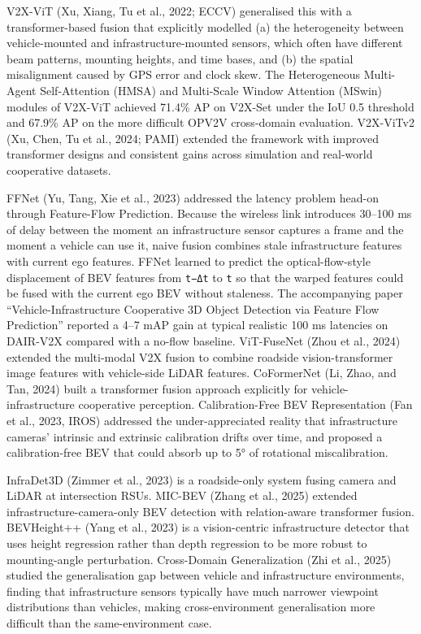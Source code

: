 V2X-ViT (Xu, Xiang, Tu et al., 2022; ECCV) generalised this with a transformer-based fusion that explicitly modelled (a) the heterogeneity between vehicle-mounted and infrastructure-mounted sensors, which often have different beam patterns, mounting heights, and time bases, and (b) the spatial misalignment caused by GPS error and clock skew. The Heterogeneous Multi-Agent Self-Attention (HMSA) and Multi-Scale Window Attention (MSwin) modules of V2X-ViT achieved 71.4\% AP on V2X-Set under the IoU 0.5 threshold and 67.9\% AP on the more difficult OPV2V cross-domain evaluation. V2X-ViTv2 (Xu, Chen, Tu et al., 2024; PAMI) extended the framework with improved transformer designs and consistent gains across simulation and real-world cooperative datasets.

FFNet (Yu, Tang, Xie et al., 2023) addressed the latency problem head-on through Feature-Flow Prediction. Because the wireless link introduces 30--100 ms of delay between the moment an infrastructure sensor captures a frame and the moment a vehicle can use it, naive fusion combines stale infrastructure features with current ego features. FFNet learned to predict the optical-flow-style displacement of BEV features from \texttt{t−Δt} to \texttt{t} so that the warped features could be fused with the current ego BEV without staleness. The accompanying paper ``Vehicle-Infrastructure Cooperative 3D Object Detection via Feature Flow Prediction'' reported a 4--7 mAP gain at typical realistic 100 ms latencies on DAIR-V2X compared with a no-flow baseline. ViT-FuseNet (Zhou et al., 2024) extended the multi-modal V2X fusion to combine roadside vision-transformer image features with vehicle-side LiDAR features. CoFormerNet (Li, Zhao, and Tan, 2024) built a transformer fusion approach explicitly for vehicle-infrastructure cooperative perception. Calibration-Free BEV Representation (Fan et al., 2023, IROS) addressed the under-appreciated reality that infrastructure cameras' intrinsic and extrinsic calibration drifts over time, and proposed a calibration-free BEV that could absorb up to 5° of rotational miscalibration.

InfraDet3D (Zimmer et al., 2023) is a roadside-only system fusing camera and LiDAR at intersection RSUs. MIC-BEV (Zhang et al., 2025) extended infrastructure-camera-only BEV detection with relation-aware transformer fusion. BEVHeight++ (Yang et al., 2023) is a vision-centric infrastructure detector that uses height regression rather than depth regression to be more robust to mounting-angle perturbation. Cross-Domain Generalization (Zhi et al., 2025) studied the generalisation gap between vehicle and infrastructure environments, finding that infrastructure sensors typically have much narrower viewpoint distributions than vehicles, making cross-environment generalisation more difficult than the same-environment case.

